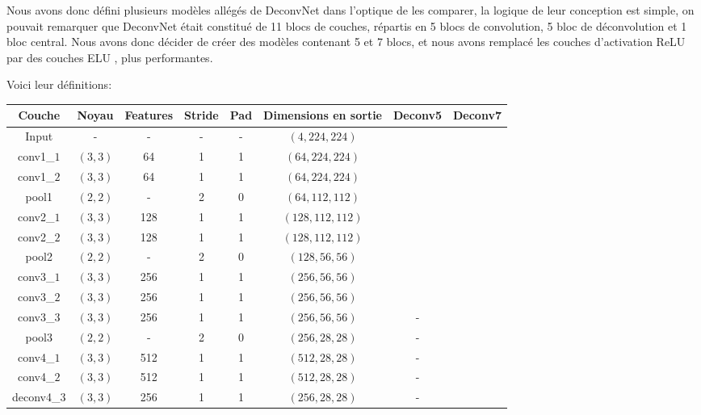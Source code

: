 \documentclass[a4paper, 11pt]{report}
\begin{document}
Nous avons donc défini plusieurs modèles allégés de DeconvNet dans l'optique de les comparer, la logique de leur conception est simple, on pouvait remarquer que DeconvNet était constitué de 11 blocs de couches, répartis en 5 blocs de convolution, 5 bloc de déconvolution et 1 bloc central.
Nous avons donc décider de créer des modèles contenant 5 et 7 blocs, et nous avons remplacé les couches d'activation ReLU par des couches ELU \citep{Clevert2015}, plus performantes.

Voici leur définitions:
\begin{table}[H]
	\centering
	\begin{tabular}{|c|c|c|c|c|c|c|c|}
	\hline 
	Couche & Noyau & Features & Stride & Pad & Dimensions en sortie & Deconv5 & Deconv7\\ 
	\hline 
	Input & - & - & - & - & $(4, 224, 224)$ & \checkmark & \checkmark \\ 
	\hline 
	conv1\_$1$ & $(3, 3)$ & 64 & 1 & 1 & $(64, 224, 224)$ & \checkmark & \checkmark \\
	\hline 
	conv1\_$2$ & $(3, 3)$ & 64 & 1 & 1 & $(64, 224, 224)$ & \checkmark & \checkmark \\
	\hline 
	pool1 & $(2, 2)$ & - & 2 & 0 & $(64, 112, 112)$ & \checkmark & \checkmark \\
	\hline 
	conv2\_$1$ & $(3, 3)$ & 128 & 1 & 1 & $(128, 112, 112)$ & \checkmark & \checkmark \\
	\hline 
	conv2\_$2$ & $(3, 3)$ & 128 & 1 & 1 & $(128, 112, 112)$ & \checkmark & \checkmark \\
	\hline 
	pool2 & $(2, 2)$ & - & 2 & 0 & $(128, 56, 56)$ & \checkmark & \checkmark \\
	\hline 
	conv3\_$1$ & $(3, 3)$ & 256 & 1 & 1 & $(256, 56, 56)$ & \checkmark & \checkmark \\
	\hline 
	conv3\_$2$ & $(3, 3)$ & 256 & 1 & 1 & $(256, 56, 56)$ & \checkmark & \checkmark \\
	\hline 
	conv3\_$3$ & $(3, 3)$ & 256 & 1 & 1 & $(256, 56, 56)$ & - & \checkmark \\
	\hline 
	pool3 & $(2, 2)$ & - & 2 & 0 & $(256, 28, 28)$ & - & \checkmark \\
	\hline 
	conv4\_$1$ & $(3, 3)$ & 512 & 1 & 1 & $(512, 28, 28)$ & - & \checkmark \\
	\hline 
	conv4\_$2$ & $(3, 3)$ & 512 & 1 & 1 & $(512, 28, 28)$ & - & \checkmark \\
	\hline
	deconv4\_$3$ & $(3, 3)$ & 256 & 1 & 1 & $(256, 28, 28)$ & - & \checkmark \\

\end{tabular}
\end{table}
\end{document}
